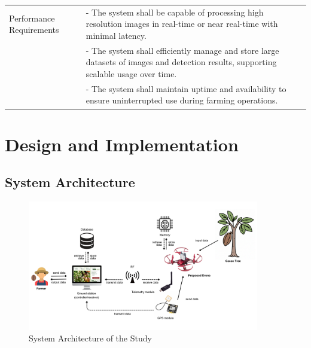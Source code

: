 \begin{longtable}{p{4cm} p{8cm}}
	Performance Requirements & - The system shall be capable of processing high resolution images in real-time or near real-time with minimal latency.                                    \\
	                         & - The system shall efficiently manage and store large datasets of images and detection results, supporting scalable usage over time.                       \\
	                         & - The system shall maintain uptime and availability to ensure uninterrupted use during farming operations.                                                 \\
\end{longtable}

\section{Design and Implementation}
\subsection{System Architecture}

\begin{figure}[H]
	\centering
	\caption{System Architecture of the Study}
	\label{fig:SysArch}
	\includegraphics[width=0.9\textwidth]{figures/Sys_Arch.pdf}
\end{figure}

